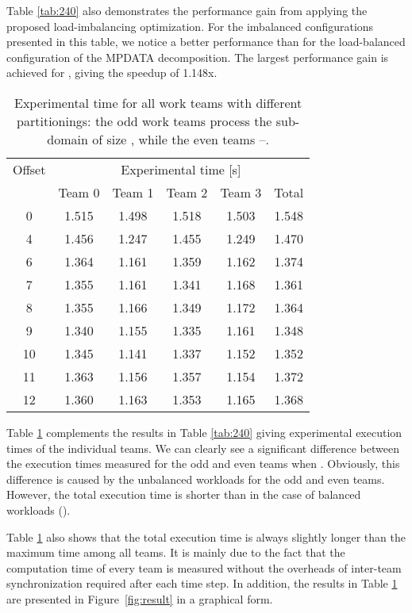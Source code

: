 \documentclass{acm_proc_article-sp}
\begin{document}
  
Table \ref{tab:240} also demonstrates  the performance gain from applying the proposed load-imbalancing optimization.
For the imbalanced configurations presented in this table, we notice a better performance than for the load-balanced configuration of the MPDATA decomposition.
The largest performance gain is achieved for , giving the speedup of 1.148x.  

 
\begin{table}[h]
\caption{Experimental time for all work teams with different partitionings: 
the odd work teams process the sub-domain of size , while the even teams --.}
\label{tab:teams}
\centering
\begin{tabular}{|c||c|c|c|c||c|}
\hline
Offset	&	\multicolumn{5}{|c|}{ Experimental time [s]}		\\ \cline{2-6}
	&	Team 0	&	Team 1	&	Team 2	&	Team 3	&	Total	\\ \hline
0	&	1.515	&	1.498	&	1.518	&	1.503	&	1.548	\\	\hline
4	&	1.456	&	1.247	&	1.455	&	1.249	&	1.470	\\	\hline
6	&	1.364	&	1.161	&	1.359	&	1.162	&	1.374	\\	\hline
7	&	1.355	&	1.161	&	1.341	&	1.168	&	1.361	\\	\hline
8	&	1.355	&	1.166	&	1.349	&	1.172	&	1.364	\\	\hline
9	&	1.340	&	1.155	&	1.335	&	1.161	&	1.348	\\	\hline
10	&	1.345	&	1.141	&	1.337	&	1.152	&	1.352	\\	\hline
11	&	1.363	&	1.156	&	1.357	&	1.154	&	1.372	\\	\hline
12	&	1.360	&	1.163	&	1.353	&	1.165	&	1.368	\\	\hline
\end{tabular}
\end{table}

      
Table \ref{tab:teams} complements the results in Table \ref{tab:240} giving experimental execution times of the individual teams.
We can clearly see a significant difference between the execution times measured for the odd and even teams when .
Obviously, this difference is caused by the unbalanced workloads for the odd and even teams.
However, the total execution time is shorter than in the case of balanced workloads ().


Table \ref{tab:teams} also shows that the total execution time is always slightly longer than the maximum time among all teams. 
It is mainly due to the fact that the computation time of every team is measured without the overheads of inter-team synchronization required after each time step.
In addition, the results in Table \ref{tab:teams} are presented in \mbox{Figure~\ref{fig:result}} in a graphical form.
\end{document}
